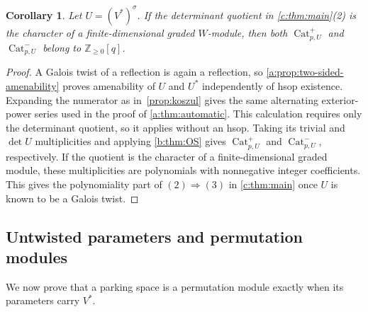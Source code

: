 \documentclass[10pt,a4paper]{amsart}
\DeclareMathOperator{\Cat}{Cat}
\newtheorem{corollary}[theorem]{Corollary}
\theoremstyle{definition}
\newcommand{\Z}{\mathbb Z}\newcommand{\N}{\mathbb Z_{\ge0}}
\begin{document}
\begin{corollary}\label{cor:formal-products}
Let $U=(V^*)^\sigma$. If the determinant quotient in
\cref{c:thm:main}(2) is the character of a finite-dimensional graded
$W$-module, then both $\Cat^+_{p,U}$ and $\Cat^-_{p,U}$ belong to
$\Z_{\geq0}[q]$.
\end{corollary}
\begin{proof}
A Galois twist of a reflection is again a reflection, so
\cref{a:prop:two-sided-amenability} proves amenability of $U$ and
$U^*$ independently of hsop existence. Expanding the numerator as
in~\cref{prop:koszul} gives the same alternating exterior-power series
used in the proof of \cref{a:thm:automatic}. This calculation requires
only the determinant quotient, so it applies without an hsop.
Taking its trivial and $\det U$ multiplicities and applying
\cref{b:thm:OS} gives $\Cat^+_{p,U}$ and $\Cat^-_{p,U}$, respectively.
If the quotient is the character of a finite-dimensional graded module,
these multiplicities are polynomials with nonnegative integer
coefficients. This gives the polynomiality part of $(2)\Rightarrow(3)$
in \cref{c:thm:main} once $U$ is known to be a Galois twist.
\end{proof}


\subsection{Untwisted parameters and permutation modules}\label{sec:permutation}

We now prove that a parking space is a permutation module exactly
when its parameters carry $V^*$. %
\end{document}
